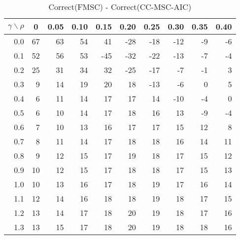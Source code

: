\documentclass[12pt]{article}
\begin{document}
%
\begin{table}[!tbp]
\caption{Correct(FMSC) - Correct(CC-MSC-AIC)}
 \begin{center}
 \begin{tabular}{r|rrrrrrrrr}\hline\hline
\multicolumn{1}{c|}{$\gamma\backslash\rho$}&\multicolumn{1}{c}{0}&\multicolumn{1}{c}{0.05}&\multicolumn{1}{c}{0.10}&\multicolumn{1}{c}{0.15}&\multicolumn{1}{c}{0.20}&\multicolumn{1}{c}{0.25}&\multicolumn{1}{c}{0.30}&\multicolumn{1}{c}{0.35}&\multicolumn{1}{c}{0.40}\tabularnewline
\hline



0.0&67&63&54& 41&-28&-18&-12&-9&-6\tabularnewline
0.1&52&56&53&-45&-32&-22&-13&-7&-4\tabularnewline
0.2&25&31&34& 32&-25&-17& -7&-1& 3\tabularnewline
0.3& 9&14&19& 20& 18&-13& -6& 0& 5\tabularnewline
0.4& 6&11&14& 17& 17& 14&-10&-4& 0\tabularnewline
0.5& 6&10&14& 17& 18& 16& 13&-9&-4\tabularnewline
0.6& 7&10&13& 16& 17& 17& 15&12& 8\tabularnewline
0.7& 8&11&14& 17& 18& 18& 16&14&11\tabularnewline
0.8& 9&12&15& 17& 19& 18& 17&15&12\tabularnewline
0.9&10&12&15& 17& 18& 18& 17&15&13\tabularnewline
1.0&10&13&16& 17& 18& 19& 17&16&14\tabularnewline
1.1&12&14&16& 18& 18& 19& 18&17&15\tabularnewline
1.2&13&14&17& 18& 20& 19& 18&17&16\tabularnewline
1.3&13&15&17& 18& 20& 19& 18&18&16\tabularnewline
\hline
\end{tabular}

\end{center}

\end{table}
\end{document}
